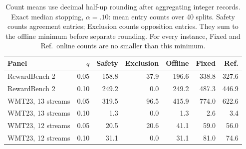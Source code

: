 \begin{table}[t]
\centering\small
\begin{tabular}{lrrrrrr}
\toprule
Panel & $q$ & Safety & Exclusion & Offline & Fixed & Ref. \\
\midrule
RewardBench 2 & 0.05 & 158.8 & 37.9 & 196.6 & 338.8 & 327.6 \\
RewardBench 2 & 0.10 & 249.2 & 0.0 & 249.2 & 487.3 & 446.9 \\
WMT23, 13 streams & 0.05 & 319.5 & 96.5 & 415.9 & 774.0 & 622.6 \\
WMT23, 13 streams & 0.10 & 1.3 & 0.0 & 1.3 & 2.6 & 3.4 \\
WMT23, 12 streams & 0.05 & 20.5 & 20.6 & 41.1 & 59.0 & 56.0 \\
WMT23, 12 streams & 0.10 & 31.1 & 0.0 & 31.1 & 81.0 & 74.6 \\
\bottomrule
\end{tabular}
\caption{Count means use decimal half-up rounding after aggregating integer records. Exact median stopping, $\alpha=.10$: mean entry counts over 40 splits. Safety counts agreement entries; Exclusion counts opposition entries. They sum to the offline minimum before separate rounding. For every instance, Fixed and Ref.\ online counts are no smaller than this minimum.}
\label{tab:certificates}
\end{table}
